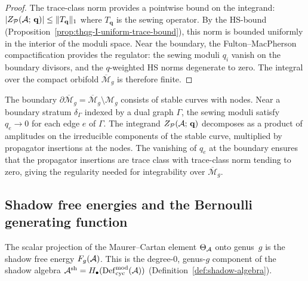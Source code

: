 \begin{proof}
The trace-class norm provides a pointwise bound on the integrand: $|Z_{\mathcal{P}}(\mathcal{A};\,\mathbf{q})| \leq \|T_{\mathbf{q}}\|_1$ where $T_{\mathbf{q}}$ is the sewing operator. By the HS-bound (Proposition~\ref{prop:thqg-I-uniform-trace-bound}), this norm is bounded uniformly in the interior of the moduli space. Near the boundary, the Fulton--MacPherson compactification provides the regulator: the sewing moduli $q_i$ vanish on the boundary divisors, and the $q$-weighted HS norms degenerate to zero. The integral over the compact orbifold $\overline{\mathcal{M}}_g$ is therefore finite.
\end{proof}

\begin{remark}
\label{rem:thqg-I-dm-boundary}
The boundary $\partial\overline{\mathcal{M}}_g = \overline{\mathcal{M}}_g \setminus \mathcal{M}_g$ consists of stable curves with nodes. Near a boundary stratum $\delta_\Gamma$ indexed by a dual graph $\Gamma$, the sewing moduli satisfy $q_e \to 0$ for each edge $e$ of $\Gamma$. The integrand $Z_{\mathcal{P}}(\mathcal{A};\,\mathbf{q})$ decomposes as a product of amplitudes on the irreducible components of the stable curve, multiplied by propagator insertions at the nodes. The vanishing of $q_e$ at the boundary ensures that the propagator insertions are trace class with trace-class norm tending to zero, giving the regularity needed for integrability over $\overline{\mathcal{M}}_g$.
\end{remark}



\subsection{Shadow free energies and the Bernoulli generating function}
\label{subsec:thqg-I-shadow-free-energies}

The scalar projection of the Maurer--Cartan element $\Theta_{\mathcal{A}}$ onto genus~$g$ is the shadow free energy $F_g(\mathcal{A})$. This is the degree-$0$, genus-$g$ component of the shadow algebra $\mathcal{A}^{\mathrm{sh}} = H_\bullet(\operatorname{Def}_{\mathrm{cyc}}^{\mathrm{mod}}(\mathcal{A}))$ (Definition~\ref{def:shadow-algebra}).

